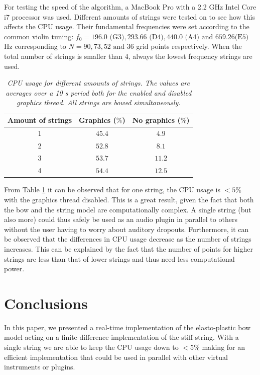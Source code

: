 \documentclass[twoside,a4paper,dvipsnames]{article}
\begin{document}
For testing the speed of the algorithm, a MacBook Pro with a 2.2 GHz Intel Core i7 processor was used. Different amounts of strings were tested on to see how this affects the CPU usage. Their fundamental frequencies were set according to the common violin tuning: $f_0 = 196.0 \text{ (G3)}, 293.66 \text{ (D4)}, 440.0 \text{ (A4)} \text{ and }659.26\allowbreak \text{(E5)}$ Hz corresponding to $N = 90, 73, 52\text{ and }36$ grid points respectively. When the total number of strings is smaller than 4, always the lowest frequency strings are used.
\begin{table}[h]
  \caption{{\it CPU usage for different amounts of strings. The values are averages over a 10 s period both for the enabled and disabled graphics thread. All strings are bowed simultaneously.}}
	\centering
  \begin{tabular}{|c|c|c|}\hline
    Amount of strings & Graphics ($\%$) & No graphics ($\%$)\\ \hline
    
    1 & $45.4$ & $4.9$\\
    2 & $52.8$ & $8.1$\\
    3 & $53.7$ & $11.2$\\
    4 & $54.4$ & $12.5$\\
    \hline
 \end{tabular}
  \label{tab:results}
\end{table}

From Table \ref{tab:results} it can be observed that for one string, the CPU usage is $<5\%$ with the graphics thread disabled. This is a great result, given the fact that both the bow and the string model are computationally complex. A single string (but also more) could thus safely be used as an audio plugin in parallel to others without the user having to worry about auditory dropouts. Furthermore, it can be observed that the differences in CPU usage decrease as the number of strings increases. This can be explained by the fact that the number of points for higher strings are less than that of lower strings and thus need less computational power.

\section{Conclusions}\label{sec:conclusion}
In this paper, we presented a real-time implementation of the elasto-plastic bow model acting on a finite-difference implementation of the stiff string. With a single string we are able to keep the CPU usage down to $<5\%$ making for an efficient implementation that could be used in parallel with other virtual instruments or plugins.
\end{document}
